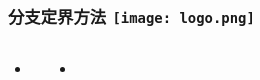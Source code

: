 \begin{comment}
\end{comment}
\begin{frame}[fragile]
\frametitle{分支定界方法 \hfill \texttt{[image: logo.png]}}
\begin{columns}
	\begin{itemize}
		\item 
		\vspace{0.2cm}
	\end{itemize}
	\begin{itemize}
		\item 
\begin{columns}	
	\begin{minipage}{6.5cm}
		\begin{lstlisting}[frame=shadowbox]  
		\end{lstlisting}
	\end{minipage}
\end{columns}
	\end{itemize}
\end{columns}
\end{frame}



